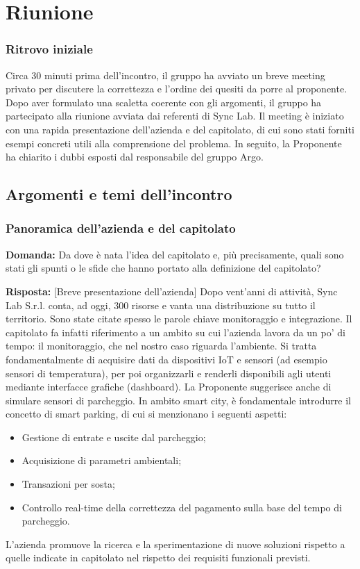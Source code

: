\section{Riunione}
\subsubsection{Ritrovo iniziale}
Circa 30 minuti prima dell’incontro, il gruppo ha avviato un breve meeting privato per discutere la correttezza e l’ordine dei quesiti da porre al proponente. Dopo aver formulato una scaletta coerente con gli argomenti, il gruppo ha partecipato alla riunione avviata dai referenti di Sync Lab. Il meeting è iniziato con una rapida presentazione dell’azienda e del capitolato, di cui sono stati forniti esempi concreti utili alla comprensione del problema. In seguito, la Proponente ha chiarito i dubbi esposti dal responsabile del gruppo Argo.

\subsection{Argomenti e temi dell'incontro}

\subsubsection{Panoramica dell’azienda e del capitolato}
\textbf{Domanda:} Da dove è nata l’idea del capitolato e, più precisamente, quali sono stati gli spunti o le sfide che hanno portato alla definizione del capitolato?

\textbf{Risposta:} [Breve presentazione dell’azienda] Dopo vent'anni di attività, Sync Lab S.r.l. conta, ad oggi, 300 risorse e vanta una distribuzione su tutto il territorio. Sono state citate spesso le parole chiave monitoraggio e integrazione. Il capitolato fa infatti riferimento a un ambito su cui l’azienda lavora da un po' di tempo: il monitoraggio, che nel nostro caso riguarda l’ambiente. Si tratta fondamentalmente di acquisire dati da dispositivi IoT e sensori (ad esempio sensori di temperatura), per poi organizzarli e renderli disponibili agli utenti mediante interfacce grafiche (dashboard).
La Proponente suggerisce anche di simulare sensori di parcheggio. In ambito smart city, è fondamentale introdurre il concetto di smart parking, di cui si menzionano i seguenti aspetti:
\begin{itemize}
	\item Gestione di entrate e uscite dal parcheggio;
	\item Acquisizione di parametri ambientali;
	\item Transazioni per sosta;
	\item Controllo real-time della correttezza del pagamento sulla base del tempo di parcheggio.
\end{itemize}
L’azienda promuove la ricerca e la sperimentazione di nuove soluzioni rispetto a quelle indicate in capitolato nel rispetto dei requisiti funzionali previsti.

